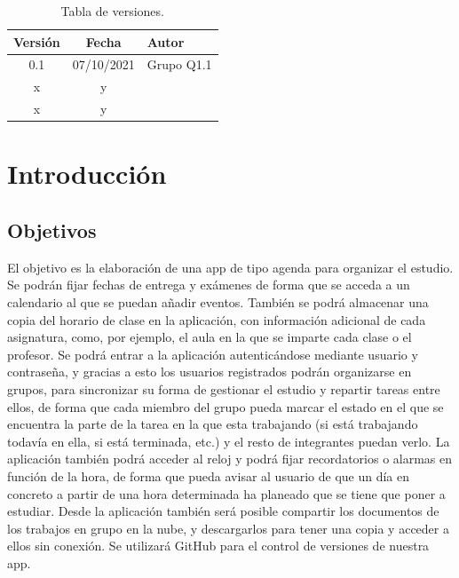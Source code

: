 \documentclass[a4paper,openright,12pt]{article}
\begin{document}
\begin{flushright}
\begin{table}[hbtp]
\begin{center}

\caption{Tabla de versiones.}
\label{tabla:versiones}
\small
\vspace{1ex}

\begin{tabular}{|c|c|l|}
\hline
Versión & Fecha & Autor \\
\hline \hline
0.1 & 07/10/2021 & Grupo Q1.1 \\ \hline
x & y & \\ \hline
x & y & \\ \hline
\end{tabular}

\end{center}
\end{table}
\end{flushright}


\newpage
{}


\section{Introducción}\label{cap.introduccion}

\subsection{Objetivos}
El objetivo es la elaboración de una app de tipo agenda para organizar el estudio. Se podrán fijar fechas de entrega y exámenes de forma que se acceda a un calendario al que se puedan añadir eventos. También se podrá almacenar una copia del horario de clase en la aplicación, con información adicional de cada asignatura, como, por ejemplo, el aula en la que se imparte cada clase o el profesor. Se podrá entrar a la aplicación autenticándose mediante usuario y contraseña, y gracias a esto los usuarios registrados podrán organizarse en grupos, para sincronizar su forma de gestionar el estudio y repartir tareas entre ellos, de forma que cada miembro del grupo pueda marcar el estado en el que se encuentra la parte de la tarea en la que esta trabajando (si está trabajando todavía en ella, si está terminada, etc.) y el resto de integrantes puedan verlo. La aplicación también podrá acceder al reloj y podrá fijar recordatorios o alarmas en función de la hora, de forma que pueda avisar al usuario de que un día en concreto a partir de una hora determinada ha planeado que se tiene que poner a estudiar. Desde la aplicación también será posible compartir los documentos de los trabajos en grupo en la nube, y descargarlos para tener una copia y acceder a ellos sin conexión.
Se utilizará GitHub para el control de versiones de nuestra app. \cite{misc-git}
\end{document}
